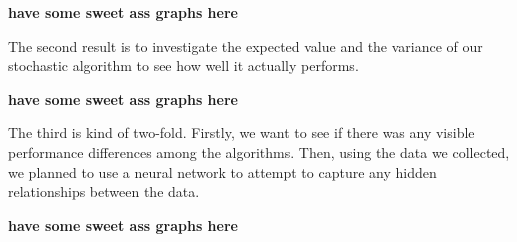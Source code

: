 \documentclass[paper=a4, fontsize=11pt]{scrartcl} %
\numberwithin{equation}{section} %
\numberwithin{figure}{section} %
\numberwithin{table}{section} %
\begin{document}
\textbf{have some sweet ass graphs here}

The second result is to investigate the expected value and the variance of our stochastic algorithm to see how well it actually performs.

\textbf{have some sweet ass graphs here}

The third is kind of two-fold.  Firstly, we want to see if there was any visible performance differences among the algorithms.  Then, using the data we collected, we planned to use a neural network to attempt to capture any hidden relationships between the data.

\textbf{have some sweet ass graphs here}







\nocite{*}
 

\end{document}
